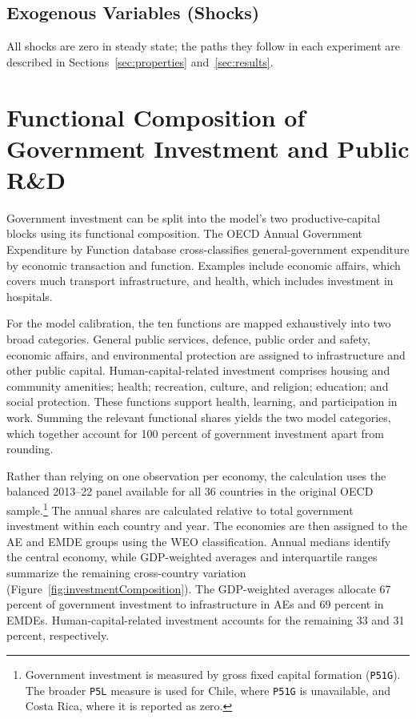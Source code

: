 \documentclass[a4paper,11pt]{article}
\begin{document}


\subsection{Exogenous Variables (Shocks)}

All shocks are zero in steady state; the paths they follow in each experiment are described in Sections~\ref{sec:properties} and~\ref{sec:results}.



\clearpage
\section{Functional Composition of Government Investment and Public R\&D} \label{app:investmentComposition}

Government investment can be split into the model's two productive-capital blocks using its functional composition.
The OECD Annual Government Expenditure by Function database cross-classifies general-government expenditure by economic transaction and function.
Examples include economic affairs, which covers much transport infrastructure, and health, which includes investment in hospitals.

For the model calibration, the ten functions are mapped exhaustively into two broad categories.
General public services, defence, public order and safety, economic affairs, and environmental protection are assigned to infrastructure and other public capital.
Human-capital-related investment comprises housing and community amenities; health; recreation, culture, and religion; education; and social protection.
These functions support health, learning, and participation in work.
Summing the relevant functional shares yields the two model categories, which together account for 100 percent of government investment apart from rounding.

Rather than relying on one observation per economy, the calculation uses the balanced 2013--22 panel available for all 36 countries in the original OECD sample.\footnote{Government investment is measured by gross fixed capital formation (\texttt{P51G}).
The broader \texttt{P5L} measure is used for Chile, where \texttt{P51G} is unavailable, and Costa Rica, where it is reported as zero.}
The annual shares are calculated relative to total government investment within each country and year.
The economies are then assigned to the AE and EMDE groups using the WEO classification.
Annual medians identify the central economy, while GDP-weighted averages and interquartile ranges summarize the remaining cross-country variation (Figure~\ref{fig:investmentComposition}).
The GDP-weighted averages allocate 67 percent of government investment to infrastructure in AEs and 69 percent in EMDEs.
Human-capital-related investment accounts for the remaining 33 and 31 percent, respectively.
\end{document}
